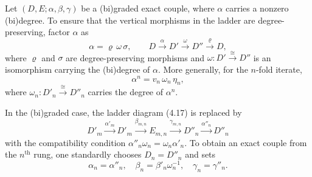 \begin{definition}
Let $(D, E; \alpha, \beta, \gamma)$ be a (bi)graded exact couple, where $\alpha$ carries a nonzero (bi)degree. To ensure that the vertical morphisms in the ladder are degree-preserving, factor $\alpha$ as
\[
\alpha = \varrho\,\omega\,\sigma,
\qquad
D \xrightarrow{\alpha} D' \xrightarrow{\omega} D'' \xrightarrow{\varrho} D,
\tag{4.29}
\]
where $\varrho$ and $\sigma$ are degree-preserving morphisms and $\omega : D' \xrightarrow{\cong} D''$ is an isomorphism carrying the (bi)degree of $\alpha$. More generally, for the $n$-fold iterate,
\[
\alpha^n = v_n\,\omega_n\,\eta_n,
\]
where $\omega_n : D'_n \xrightarrow{\cong} D''_n$ carries the degree of $\alpha^n$.
\end{definition}

\begin{remark}
In the (bi)graded case, the ladder diagram (4.17) is replaced by
\[
D'_m \xrightarrow{\alpha'_m} D'_m \xrightarrow{\beta_{m,n}} E_{m,n} \xrightarrow{\gamma_{m,n}} D''_n \xrightarrow{\alpha''_n} D''_n
\tag{4.30}
\]
with the compatibility condition $\alpha''_n\omega_n = \omega_n\alpha'_n$. To obtain an exact couple from the $n^{\text{th}}$ rung, one standardly chooses $D_n = D''_n$ and sets
\[
\alpha_n = \alpha''_n, \quad \beta_n = \beta'_n\omega_n^{-1}, \quad \gamma_n = \gamma''_n.
\]
\end{remark}
